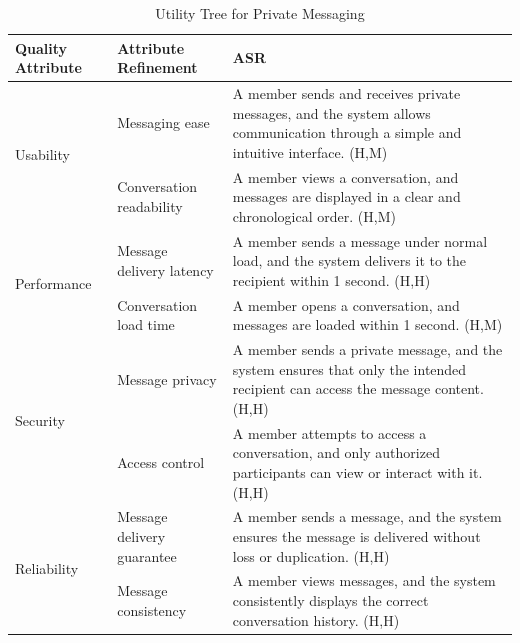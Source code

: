 \documentclass{article}
\begin{document}
\begin{table}[H]
    \centering
    \caption{Utility Tree for Private Messaging}
    \begin{tabular}{|p{3cm}|p{4cm}|p{7cm}|}
        \hline
        \textbf{Quality Attribute} & \textbf{Attribute Refinement}                                                                                                     & \textbf{ASR} \\
        \hline

        \multirow{2}{*}{Usability}
                                   & Messaging ease
                                   & A member sends and receives private messages, and the system allows communication through a simple and intuitive interface. (H,M)                \\
        \cline{2-3}
                                   & Conversation readability
                                   & A member views a conversation, and messages are displayed in a clear and chronological order. (H,M)                                              \\
        \hline

        \multirow{2}{*}{Performance}
                                   & Message delivery latency
                                   & A member sends a message under normal load, and the system delivers it to the recipient within 1 second. (H,H)                                   \\
        \cline{2-3}
                                   & Conversation load time
                                   & A member opens a conversation, and messages are loaded within 1 second. (H,M)                                                                    \\
        \hline

        \multirow{2}{*}{Security}
                                   & Message privacy
                                   & A member sends a private message, and the system ensures that only the intended recipient can access the message content. (H,H)                  \\
        \cline{2-3}
                                   & Access control
                                   & A member attempts to access a conversation, and only authorized participants can view or interact with it. (H,H)                                 \\
        \hline

        \multirow{2}{*}{Reliability}
                                   & Message delivery guarantee
                                   & A member sends a message, and the system ensures the message is delivered without loss or duplication. (H,H)                                     \\
        \cline{2-3}
                                   & Message consistency
                                   & A member views messages, and the system consistently displays the correct conversation history. (H,H)                                            \\
        \hline


\end{tabular}
\end{table}
\end{document}

